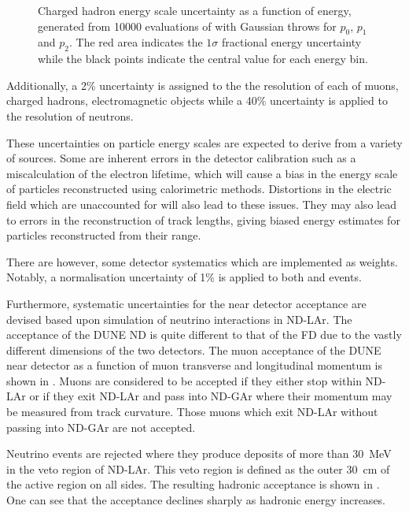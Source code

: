 \begin{figure}[h]
  \begin{adjustbox}{max totalsize=.6\textwidth, center}
    
  \end{adjustbox}
  \caption[Charged hadron energy scale uncertainty as a function of energy.]{Charged hadron energy scale uncertainty as a function of energy, generated from \num{10000} evaluations of  with Gaussian throws for $p_{0}$, $p_{1}$ and $p_{2}$. The red area indicates the $1\sigma$ fractional energy uncertainty while the black points indicate the central value for each energy bin.}
  \label{fig:protonEScale}
\end{figure}

Additionally, a 2\% uncertainty is assigned to the the resolution of each of muons, charged hadrons, electromagnetic objects while a 40\% uncertainty is applied to the resolution of neutrons.

These uncertainties on particle energy scales are expected to derive from a variety of sources.
Some are inherent errors in the detector calibration such as a miscalculation of the electron lifetime, which will cause a bias in the energy scale of particles reconstructed using calorimetric methods.
Distortions in the electric field which are unaccounted for will also lead to these issues. 
They may also lead to errors in the reconstruction of track lengths, giving biased energy estimates for particles reconstructed from their range.

There are however, some detector systematics which are implemented as weights. 
Notably, a normalisation uncertainty of 1\% is applied to both \numu and \nue events.

Furthermore, systematic uncertainties for the near detector acceptance are devised based upon simulation of neutrino interactions in ND-LAr.
The acceptance of the DUNE ND is quite different to that of the FD due to the vastly different dimensions of the two detectors.
The muon acceptance of the DUNE near detector as a function of muon transverse and longitudinal momentum is shown in . 
Muons are considered to be accepted if they either stop within ND-LAr or if they exit ND-LAr and pass into ND-GAr where their momentum may be measured from track curvature.
Those muons which exit ND-LAr without passing into ND-GAr are not accepted.

Neutrino events are rejected where they produce deposits of more than \SI{30}{\MeV} in the veto region of ND-LAr.
This veto region is defined as the outer \SI{30}{\cm} of the active region on all sides.
The resulting hadronic acceptance is shown in .
One can see that the acceptance declines sharply as hadronic energy increases.

